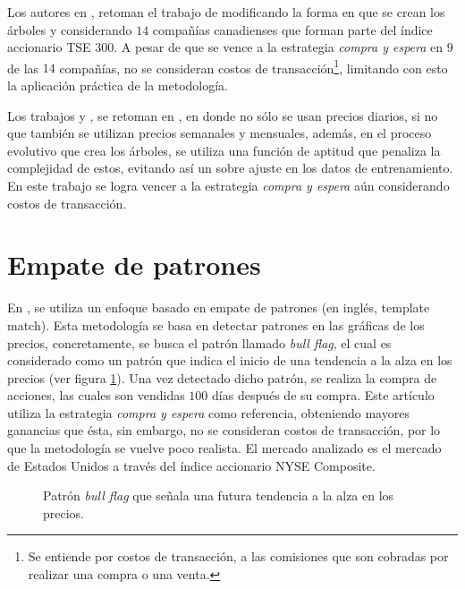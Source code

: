 \documentclass[12pt]{report}
\theoremstyle{break}
\theoremstyle{break}
\begin{document}
Los autores en \cite{Potvin2004}, retoman el trabajo de \cite{Allen1999} modificando la forma en que se crean los árboles y considerando $14$ compañías canadienses que forman parte del índice accionario TSE $300$. A pesar de que se vence a la estrategia \textit{compra y espera} en $9$ de las $14$ compañías, no se consideran costos de transacción\footnote{Se entiende por costos de transacción, a las comisiones que son cobradas por realizar una compra o una venta.}, limitando con esto la aplicación práctica de la metodología. 

Los trabajos \cite{Allen1999} y \cite{Potvin2004}, se retoman en \cite{Lohpetch2010}, en donde no sólo se usan precios diarios, si no que también se utilizan precios semanales y mensuales, además, en el proceso evolutivo que crea los árboles, se utiliza una función de aptitud que penaliza la complejidad de estos, evitando así un sobre ajuste en los datos de entrenamiento. En este trabajo se logra vencer a la estrategia \textit{compra y espera} aún considerando costos de transacción.

\section{Empate de patrones}
En \cite{Leigh2002}, se utiliza un enfoque basado en empate de patrones (en inglés, template match). Esta metodología se basa en detectar patrones en las gráficas de los precios, concretamente, se busca el patrón llamado \textit{bull flag}, el cual es considerado como un patrón que indica el inicio de una tendencia a la alza en los precios (ver figura \ref{imagen:bull flag}). Una vez detectado dicho patrón, se realiza la compra de acciones, las cuales son vendidas $100$ días después de su compra. Este artículo utiliza la estrategia \textit{compra y espera} como referencia, obteniendo mayores ganancias que ésta, sin embargo, no se consideran costos de transacción, por lo que la metodología se vuelve poco realista. El mercado analizado es el mercado de Estados Unidos a través del índice accionario NYSE Composite.

\begin{figure}[ht]
\centering
{}
\caption{\label{imagen:bull flag} Patrón \textit{bull flag} que señala una futura tendencia a la alza en los precios.}
\end{figure}
\end{document}
